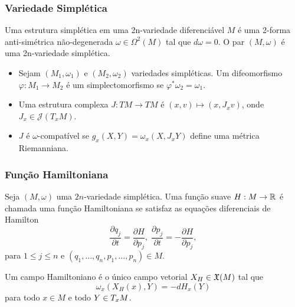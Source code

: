 \documentclass{beamer}
\begin{document}
\begin{footnotesize}
\begin{frame}
\begin{prova}
		\end{prova}
	\end{frame}
	

	\begin{frame}
		\frametitle{Variedade Simplética}
		\begin{definicao}
			
			Uma estrutura simplética em uma 2n-variedade diferenciável $M$ é uma 2-forma anti-simétrica não-degenerada $\omega\in \Omega^{2}(M)$ tal que $d\omega=0$. O par $(M, \omega)$ é uma 2n-variedade simplética.
		\end{definicao}
		
		\begin{itemize}
			\item Sejam $(M_{1}, \omega_{1})$ e $(M_{2}, \omega_{2})$ variedades simpléticas. Um difeomorfismo $\varphi: M_1\to M_2$ é um simplectomorfismo se $\varphi^{*}\omega_{2}=\omega_{1}$.
			
			\item Uma estrutura complexa $J:TM\to TM$ é $(x,v)\mapsto (x,J_{x}v)$, onde $J_{x}\in \mathcal{J}(T_{x}M)$.
			
			\item $J$ é $\omega$-compatível se $g_{x}(X,Y) = \omega_{x}(X, J_{x}Y)$ define uma métrica Riemanniana.
		\end{itemize}
		
	\end{frame}
	
	\begin{frame}
		\frametitle{Função Hamiltoniana}
		\begin{definicao}
			Seja $(M, \omega)$ uma $2n$-variedade simplética. Uma função suave $H : M \to \mathbb{R}^{}$ é chamada uma função Hamiltoniana se satisfaz as equações diferenciais de Hamilton
			$$
			\frac{\partial q_{j}}{\partial t} = \frac{\partial H}{\partial p_{j}}, \; \frac{\partial p_{j}}{\partial t} = -\frac{\partial H}{\partial p_{j}},
			$$
			para $1\leq j \leq n$ e $(q_{1}, \dots, q_{n}, p_{1}, \dots, p_{n}) \in M$.
		\end{definicao}
		
		\begin{definicao}
			Um campo Hamiltoniano é o único campo vetorial $X_{H}\in \mathfrak{X}(M)$ tal que
			$$
			\omega_{x}(X_{H}(x), Y) = -dH_{x}(Y)
			$$
			para todo $x\in M$ e todo $Y \in T_{x}M$.
		\end{definicao}
		
		
	\end{frame}


\end{footnotesize}
\end{document}
